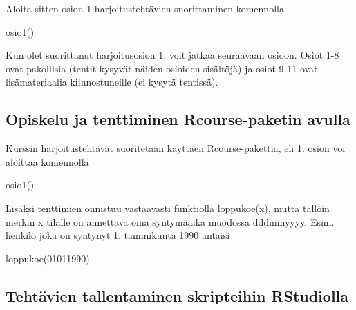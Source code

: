\documentclass[
]{book}
\newenvironment{Shaded}{\begin{snugshade}}{\end{snugshade}}
\newcommand{\DecValTok}[1]{\textcolor[rgb]{0.00,0.00,0.81}{#1}}
\newcommand{\FunctionTok}[1]{\textcolor[rgb]{0.00,0.00,0.00}{#1}}
\newcommand{\NormalTok}[1]{#1}
\begin{document}
Aloita sitten osion 1 harjoitustehtävien suorittaminen komennolla

\begin{Shaded}
\begin{Highlighting}[]
\FunctionTok{osio1}\NormalTok{()}
\end{Highlighting}
\end{Shaded}

Kun olet suorittanut harjoitusosion 1, voit jatkaa seuraavaan osioon. Osiot 1-8 ovat pakollisia (tentit kysyvät näiden osioiden sisältöjä) ja osiot 9-11 ovat lisämateriaalia kiinnostuneille (ei kysytä tentissä).

\hypertarget{opiskelu-ja-tenttiminen-rcourse-paketin-avulla}{%
\subsection*{Opiskelu ja tenttiminen Rcourse-paketin avulla}\label{opiskelu-ja-tenttiminen-rcourse-paketin-avulla}}

Kurssin harjoitustehtävät suoritetaan käyttäen Rcourse-pakettia, eli 1. osion voi aloittaa komennolla

\begin{Shaded}
\begin{Highlighting}[]
\FunctionTok{osio1}\NormalTok{()}
\end{Highlighting}
\end{Shaded}

Lisäksi tenttimien onnistuu vastaavasti funktiolla loppukoe(x), mutta tällöin merkin x tilalle on annettava oma syntymäaika muodossa dddmmyyyy. Esim. henkilö joka on syntynyt 1. tammikuuta 1990 antaisi

\begin{Shaded}
\begin{Highlighting}[]
\FunctionTok{loppukoe}\NormalTok{(}\DecValTok{01011990}\NormalTok{)}
\end{Highlighting}
\end{Shaded}

\hypertarget{tehtuxe4vien-tallentaminen-skripteihin-rstudiolla}{%
\subsection*{Tehtävien tallentaminen skripteihin RStudiolla}\label{tehtuxe4vien-tallentaminen-skripteihin-rstudiolla}}
\end{document}

